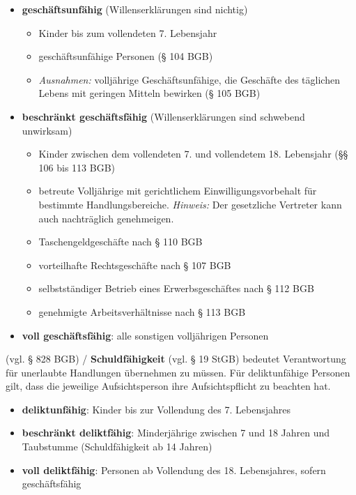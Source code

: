 \begin{itemize}
\setlength\itemsep{0em}
	\item {\bf geschäftsunfähig} (Willenserklärungen sind nichtig)
	\begin{itemize}
		\item Kinder bis zum vollendeten 7. Lebensjahr
		\item geschäftsunfähige Personen (§ 104 BGB)
		\item {\it Ausnahmen:} volljährige Geschäftsunfähige, die Geschäfte des täglichen Lebens mit geringen Mitteln bewirken (§ 105 BGB)
	\end{itemize}
	\item {\bf beschränkt geschäftsfähig} (Willenserklärungen sind schwebend unwirksam)
	\begin{itemize}
		\item Kinder zwischen dem vollendeten 7. und vollendetem 18. Lebensjahr (§§ 106 bis 113 BGB)
		\item betreute Volljährige mit gerichtlichem Einwilligungsvorbehalt für bestimmte Handlungsbereiche. {\it Hinweis:} Der gesetzliche Vertreter kann auch nachträglich genehmeigen.
		\item Taschengeldgeschäfte nach § 110 BGB
		\item vorteilhafte Rechtsgeschäfte nach § 107 BGB
		\item selbstständiger Betrieb eines Erwerbsgeschäftes nach § 112 BGB
		\item genehmigte Arbeitsverhältnisse nach § 113 BGB
	\end{itemize}
	\item {\bf voll geschäftsfähig}: alle sonstigen volljährigen Personen
\end{itemize}

 (vgl. § 828 BGB) / {\bf Schuldfähigkeit} (vgl. § 19 StGB) bedeutet Verantwortung für unerlaubte Handlungen übernehmen zu müssen. Für deliktunfähige Personen gilt, dass die jeweilige Aufsichtsperson ihre Aufsichtspflicht zu beachten hat.

\begin{itemize}
\setlength\itemsep{0em}
	\item {\bf deliktunfähig}: Kinder bis zur Vollendung des 7. Lebensjahres
	\item {\bf beschränkt deliktfähig}: Minderjährige zwischen 7 und 18 Jahren und Taubstumme (Schuldfähigkeit ab 14 Jahren)
	\item {\bf voll deliktfähig}: Personen ab Vollendung des 18. Lebensjahres, sofern geschäftsfähig
\end{itemize}

